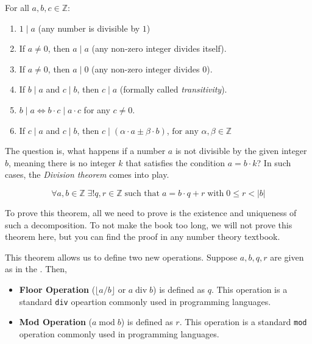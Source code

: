 \documentclass[../lecture-notes-148x210.tex]{subfiles}
\begin{document}
\begin{lemma}
    For all $a, b, c \in \mathbb{Z}:$
    \hfill
    \begin{enumerate}
        \item $1 \mid a$ (any number is divisible by $1$)
        \item If $a \neq 0$, then $a \mid a$ (any non-zero integer divides itself).
        \item If $a \neq 0$, then $a \mid 0$ (any non-zero integer divides $0$).
        \item If $b \mid a$ and $c \mid b$, then $c \mid a$ (formally called \emph{transitivity}).
        \item $b \mid a \iff b \cdot c \mid a \cdot c$ for any $c \neq 0$.
        \item If $c \mid a$ and $c \mid b$, then $c \mid (\alpha \cdot a \pm \beta \cdot b)$, $\text{for any } \alpha, \beta \in \mathbb{Z}$
    \end{enumerate}
\end{lemma}

The question is, what happens if a number $a$ is not divisible by the given integer $b$, 
meaning there is no integer $k$ that satisfies the condition $a = b \cdot k$? 
In such cases, the \emph{Division theorem} \cite[section 2]{Judson_2012} comes into play.

\begin{theorem}\label{th:division}
    \begin{equation*}
        \forall a, b \in \mathbb{Z} \; \exists! q, r \in \mathbb{Z} \; \text{such that} \; a = b \cdot q + r \; \text{with} \; 0 \leq r < |b|
    \end{equation*}
\end{theorem}

To prove this theorem, all we need to prove is the existence and uniqueness of
such a decomposition. To not make the book too long, we will not prove this
theorem here, but you can find the proof in any number theory textbook.

This theorem allows us to define two new operations. Suppose $a,b,q,r$ are given
as in the . Then,
\begin{itemize}
    \item \textbf{Floor Operation} ($\lfloor a/b \rfloor$ or $a \; \text{div} \; b$) is defined
    as $q$. This operation is a standard \texttt{div} opeartion commonly used in programming languages.
    \item \textbf{Mod Operation} ($a \; \text{mod} \; b$) is defined as $r$. This operation is a standard
\texttt{mod} operation commonly used in programming languages. 
\end{itemize}
\end{document}
